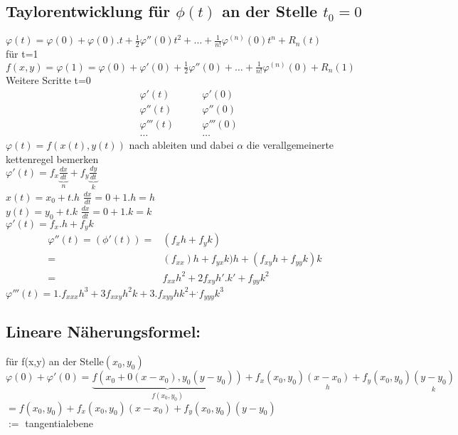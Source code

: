 \subsection{Taylorentwicklung für $\phi (t)$ an der Stelle $t_0=0$ }
\begin{flushleft}
	$\varphi (t) =\varphi (0) +\varphi (0).t+\frac{1}{2}\varphi''(0) t^2+\dots +\frac{1}{n!}\varphi ^{(n)} (0)t^n +R_n(t)$\\
für t=1\\
$f(x,y)=\varphi (1)= \varphi (0) +\varphi'(0)+\frac{1}{2}\varphi''(0) +\dots +\frac{1}{n!}\varphi ^{(n)}(0)+R_n(1)$\\
Weitere Scritte   t=0\\
\begin{align*}
	&\varphi'(t) \qquad &\varphi'(0)\\  
		&\varphi''(t) \qquad &\varphi''(0)\\  
			&\varphi'''(t) \qquad &\varphi'''(0)\\  
			& \dots \qquad &\dots  
\end{align*}
$\varphi(t) =f(x(t),y(t))  $ nach ableiten und dabei $\alpha $ die verallgemeinerte kettenregel bemerken\\
$\varphi '(t)= f_x \underbrace{\frac{dx}{dt}}_{n}+f_y\underbrace{\frac{dy}{dt}}_{k}$\\
$x(t)=x_0+t.h$   $\frac{dx}{dt}=0+1.h=h$\\
$y(t)=y_0+t.k$    $\frac{dx}{dt}=0+1.k=k$\\
$\varphi'(t)=f_x .h+f_y k$\\
\begin{align*}
\varphi''(t)= (\phi'(t))=& (f_x h+f_y k)\\
=&(f_{xx})h+f_{yx}k) h+(f_{xy}h+f_{yy}k)k\\
=& f_{xx}h^2+2f_{xy}h'.k'+f_{yy}k^2
\end{align*}
$\varphi'''(t)=1.f_{xxx}h^3  +3f_{xxy}h^2k+3.f_{xyy}hk^2+^.f_{yyy}k^3$


 

\end{flushleft}

\subsection{Lineare Näherungsformel:}
für f(x,y) an der Stelle$ (x_0,y_0)$ 
\[ \varphi (0) +\varphi'(0) = \underbrace{f(x_0+0(x-x_0),y_0(y-y_0))}_{f(x_0,y_0)} + f_x(x_0,y_0)\underset{h}{(x-x_0)}+f_y(x_0,y_0)\underset{k}{(y-y_0)} \]
$= f(x_0,y_0)+f_x(x_0,y_0)(x-x_0)+f_y(x_0,y_0)(y-y_0)$\\
$:=$ tangentialebene
